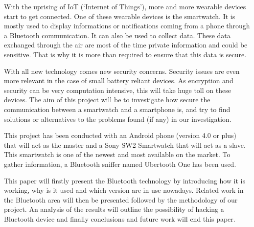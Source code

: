 
With the uprising of IoT (‘Internet of Things’), more and more wearable devices start to get connected. One of these wearable devices is the smartwatch. It is mostly used to display informations or notifications coming from a phone through a Bluetooth communication. It can also be used to collect data. These data exchanged through the air are most of the time private information and could be sensitive. That is why it is more than required to ensure that this data is secure.

With all new technology comes new security concerns. Security issues are even more relevant in the case of small battery reliant devices. As encryption and security can be very computation intensive, this will take huge toll on these devices. The aim of this project will be to investigate how secure the communication between a smartwatch and a smartphone is, and try to find solutions or alternatives to the problems found (if any) in our investigation.

This project has been conducted with an Android phone (version 4.0 or plus) that will act as the master and a Sony SW2 Smartwatch that will act as a slave. This smartwatch is one of the newest and most available on the market. To gather information, a Bluetooth sniffer named Ubertooth One has been used.

This paper will firstly present the Bluetooth technology by introducing how it is working, why is it used and which version are in use nowadays. Related work in the Bluetooth area will then be presented followed by the methodology of our project. An analysis of the results will outline the possibility of hacking a Bluetooth device and finally conclusions and future work will end this paper.